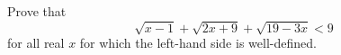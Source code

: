 \documentclass[varwidth]{standalone}
\begin{document}
    Prove that
    \[
        \sqrt{x - 1} + \sqrt{2x + 9} + \sqrt{19 - 3x} < 9    
    \]
    for all real $x$ for which the left-hand side is well-defined.
\end{document}
